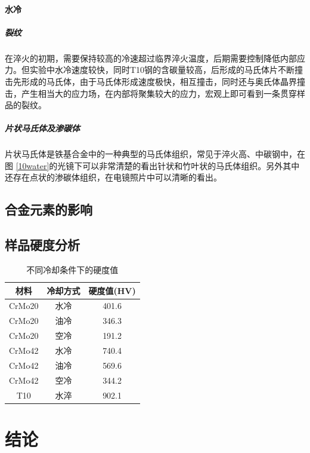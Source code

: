\documentclass[12pt]{ctexart}
\begin{document}
\paragraph{水冷}
\subparagraph{裂纹}
在淬火的初期，需要保持较高的冷速超过临界淬火温度，后期需要控制降低内部应力。但实验中水冷速度较快，同时T10钢的含碳量较高，后形成的马氏体片不断撞击先形成的马氏体，由于马氏体形成速度极快，相互撞击，同时还与奥氏体晶界撞击，产生相当大的应力场，在内部将聚集较大的应力，宏观上即可看到一条贯穿样品的裂纹。
\subparagraph{片状马氏体及渗碳体}
片状马氏体是铁基合金中的一种典型的马氏体组织，常见于淬火高、中碳钢中，在图 \ref{10water}的光镜下可以非常清楚的看出针状和竹叶状的马氏体组织。另外其中还存在点状的渗碳体组织，在电镜照片中可以清晰的看出。
\subsection{合金元素的影响}
\subsection{样品硬度分析}
\begin{table}[ht!]
  \centering
  \begin{tabular}{|c|c|c|}
    \hline
    材料 & 冷却方式 & 硬度值(HV) \\
    \hline
    CrMo20 & 水冷 & 401.6 \\
    \hline
    CrMo20 & 油冷 & 346.3 \\
    \hline
    CrMo20 & 空冷 & 191.2 \\ 
    \hline
    CrMo42 & 水冷 & 740.4 \\
    \hline
    CrMo42 & 油冷 & 569.6 \\
    \hline
    CrMo42 & 空冷 & 344.2 \\
    \hline
    T10    & 水淬 & 902.1 \\
    \hline
   \end{tabular}
  \caption{不同冷却条件下的硬度值}
\end{table}

\section{结论}
\end{document}
